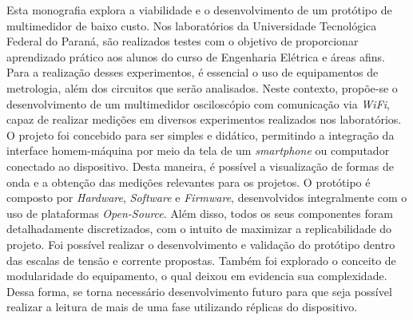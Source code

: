 

\begin{resumoutfpr}%
Esta monografia explora a viabilidade e o desenvolvimento de um protótipo de multimedidor de baixo custo. Nos laboratórios da Universidade Tecnológica Federal do Paraná, são realizados testes com o objetivo de proporcionar aprendizado prático aos alunos do curso de Engenharia Elétrica e áreas afins. Para a realização desses experimentos, é essencial o uso de equipamentos de metrologia, além dos circuitos que serão analisados.
Neste contexto, propõe-se o desenvolvimento de um multimedidor osciloscópio com comunicação via \textit{WiFi}, capaz de realizar medições em diversos experimentos realizados nos laboratórios. O projeto foi concebido para ser simples e didático, permitindo a integração da interface homem-máquina por meio da tela de um \textit{smartphone} ou computador conectado ao dispositivo. Desta maneira, é possível a visualização de formas de onda e a obtenção das medições relevantes para os projetos.
O protótipo é composto por \textit{Hardware}, \textit{Software} e \textit{Firmware}, desenvolvidos integralmente com o uso de plataformas \textit{Open-Source}. Além disso, todos os seus componentes foram detalhadamente discretizados, com o intuito de maximizar a replicabilidade do projeto.
Foi possível realizar o desenvolvimento e validação do protótipo dentro das escalas de tensão e corrente propostas. Também foi explorado o conceito de modularidade do equipamento, o qual deixou em evidencia sua complexidade. Dessa forma, se torna necessário desenvolvimento futuro para que seja possível realizar a leitura de mais de uma fase utilizando réplicas do dispositivo.
\end{resumoutfpr}
